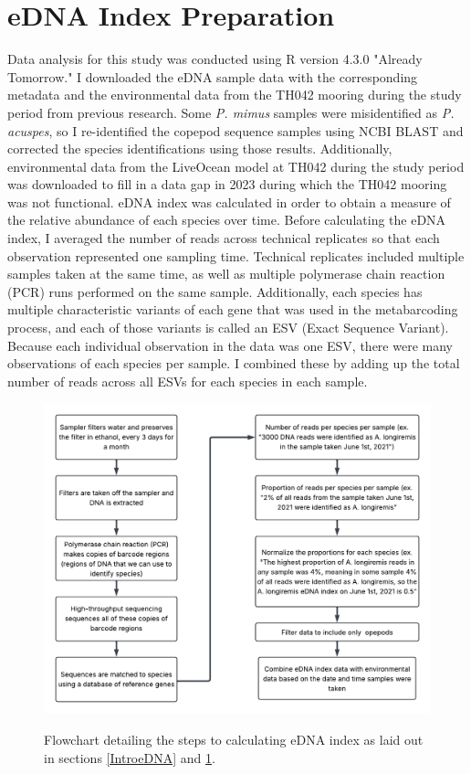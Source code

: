 \documentclass[12pt,twoside]{reedthesis}
\begin{document}
	\section{eDNA Index Preparation}\label{MethodseDNA}
	Data analysis for this study was conducted using R version 4.3.0 "Already Tomorrow." I downloaded the eDNA sample data with the corresponding metadata and the environmental data from the TH042 mooring during the study period from previous research. Some \textit{P. mimus} samples were misidentified as \textit{P. acuspes}, so I re-identified the copepod sequence samples using NCBI BLAST and corrected the species identifications using those results. Additionally, environmental data from the LiveOcean model at TH042 during the study period was downloaded to fill in a data gap in 2023 during which the TH042 mooring was not functional. eDNA index was calculated in order to obtain a measure of the relative abundance of each species over time. Before calculating the eDNA index, I averaged the number of reads across technical replicates so that each observation represented one sampling time. Technical replicates included multiple samples taken at the same time, as well as multiple polymerase chain reaction (PCR) runs performed on the same sample. Additionally, each species has multiple characteristic variants of each gene that was used in the metabarcoding process, and each of those variants is called an ESV (Exact Sequence Variant). Because each individual observation in the data was one ESV, there were many observations of each species per sample. I combined these by adding up the total number of reads across all ESVs for each species in each sample. 
	
	\begin{figure}[!h]
		\begin{center}
			\includegraphics[scale=0.7]{Fig_MethodsFlowchart} \\
			\caption[Methods]{Flowchart detailing the steps to calculating eDNA index as laid out in sections \ref{IntroeDNA} and \ref{MethodseDNA}.} %
			\label{Flowchart}
		\end{center}
	\end{figure} 
	
\end{document}
